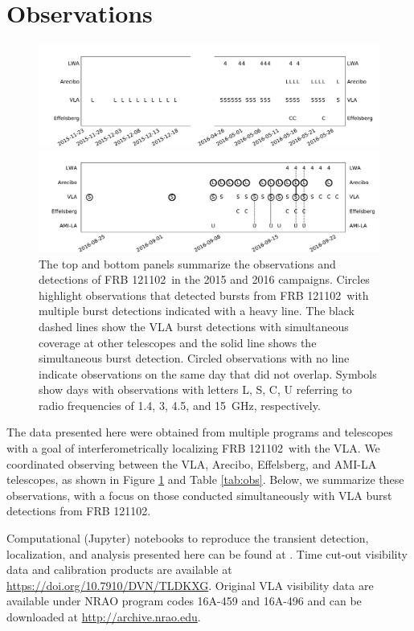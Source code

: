 \documentclass[twocolumn]{aastex61}
\newcommand{\frb}{FRB 121102}
\begin{document}
\section{Observations}
\label{sec:obs}

\begin{figure}[t]
\begin{center}
\includegraphics[width=2\columnwidth]{timeline0}

\includegraphics[width=2\columnwidth]{timeline}
\caption{The top and bottom panels summarize the observations and detections of \frb\ in the 2015 and 2016 campaigns. Circles highlight observations that detected bursts from \frb\ with multiple burst detections indicated with a heavy line. The black dashed lines show the VLA burst detections with simultaneous coverage at other telescopes and the solid line shows the simultaneous burst detection. Circled observations with no line indicate observations on the same day that did not overlap. Symbols show days with observations with letters L, S, C, U referring to radio frequencies of 1.4, 3, 4.5, and 15~GHz, respectively.
\label{fig:sched}}
\end{center}
\end{figure}

The data presented here were obtained from multiple programs and telescopes with a goal of interferometrically localizing \frb\ with the VLA. We coordinated observing between the VLA, Arecibo, Effelsberg, and AMI-LA telescopes, as shown in Figure \ref{fig:sched} and Table \ref{tab:obs}. Below, we summarize these observations, with a focus on those conducted simultaneously with VLA burst detections from \frb.

Computational (Jupyter) notebooks to reproduce the transient detection, localization, and analysis presented here can be found at . Time cut-out visibility data and calibration products are available at \url{https://doi.org/10.7910/DVN/TLDKXG}. Original VLA visibility data are available under NRAO program codes 16A-459 and 16A-496 and can be downloaded at \url{http://archive.nrao.edu}.
\end{document}

